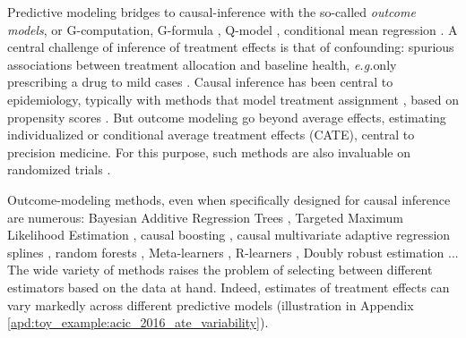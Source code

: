 \documentclass[10pt,twocolumn]{article}
\newcommand{\eg}{\emph{e.g.}}
\begin{document}
Predictive modeling bridges to causal-inference with the so-called \emph{outcome
    models}, or G-computation, G-formula \cite{robins_role_1986}, Q-model
\cite{snowden_implementation_2011}, conditional mean regression
\cite{wendling_comparing_2018}. A central challenge of inference of treatment
effects is that of confounding: spurious associations between treatment
allocation and baseline health, \eg only prescribing a drug to mild cases
\citep{hernan_causal_2020,vanderweele2019principles}.
Causal inference has been central to epidemiology, typically with methods that
model treatment assignment \cite{austin_moving_2015,casucci2018estimating,grose_use_2020}, based on
propensity scores \cite{rosenbaum_central_1983}. But outcome modeling go
beyond average effects, estimating individualized or conditional average
treatment effects (CATE), central to precision medicine.
%
For this purpose, such methods are also invaluable on randomized trials
\cite{su2018random,lamont2018identification,hoogland2021tutorial}.


Outcome-modeling methods, even when specifically designed for causal
inference are numerous: Bayesian Additive Regression Trees
\cite{hill_bayesian_2011}, Targeted Maximum Likelihood Estimation
\cite{laan_targeted_2011,schuler_targeted_2017}, causal boosting
\cite{powers_methods_2018}, causal multivariate adaptive regression
splines \cite{powers_methods_2018}, random forests
\cite{wager_estimation_2018, athey_generalized_2019},
Meta-learners \cite{kunzel_metalearners_2019}, R-learners
\cite{nie_quasioracle_2017}, Doubly robust estimation
\cite{chernozhukov_double_2018}...
The wide variety of methods raises the problem
of selecting between different estimators based on the data at hand. %
%
Indeed, estimates of treatment effects can vary markedly across different
predictive models \cite{fang2019applying,dorie_automated_2019} (illustration in
Appendix \ref{apd:toy_example:acic_2016_ate_variability}).
\end{document}
